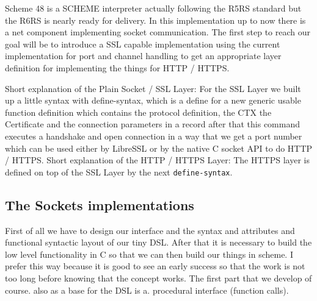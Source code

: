 \documentclass[10pt,a4paper,english]{article}
\newcommand{\code}[1]{{\tt{#1}}}
\begin{document}
\begin{multicols}{2}
\begin{flushleft}
Scheme 48 is a SCHEME interpreter actually following the R5RS standard but the R6RS is nearly ready for delivery. In this implementation up to now there is a net component implementing socket communication.
The first step to reach our goal will be to introduce a SSL capable implementation using the current implementation for port and channel handling to get an appropriate layer definition for  implementing the things for HTTP / HTTPS.
\end{flushleft}
\begin{flushleft}
Short explanation of the Plain Socket / SSL Layer:
For the SSL Layer we built up a little syntax with define-syntax,  which is a define for a new generic usable function definition which contains the protocol definition, the CTX the Certificate and the connection parameters in a record after that this command executes a handshake and  open connection in a way that we  get a port number which can be used either by LibreSSL or by the native C socket API to do HTTP / HTTPS.
Short explanation of the HTTP / HTTPS Layer:
The HTTPS layer  is defined on top of the SSL Layer by the  next \code{define-syntax}.
\end{flushleft}

\subsection{The Sockets implementations }
\begin{flushleft}
First of all we have to design our interface and the syntax and attributes and functional syntactic layout of our tiny DSL. After that it is necessary to build the low level functionality in C so that we can then build our things in scheme. I prefer this way because it is good to see an early success so that the work is not too long before knowing that the concept works. The first part that we develop of course. also as a base for the DSL is a. procedural interface (function calls).
\end{flushleft}

\end{multicols}
\end{document}
